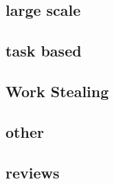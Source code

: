 \documentclass{article}
\begin{document}
\cite{Flegar:2017:OLI:3149704.3149767}
\cite{8082085}
\cite{7993387}
\cite{Cederman:2008:DLB:1413957.1413967}
\cite{10.1007/978-981-10-6442-5_56}
\cite{dlbgraphgpu}




\subsection{large scale}

\cite{PEARCE2017}
\cite{BERLINSKA201814}
\cite{8017633}
\cite{DEVINE2005133}
\cite{javataskpool}
\cite{barat:tel-01672546}



\subsection{task based}

\cite{CPE:CPE1631}
\cite{Bhatti2017}
\cite{5599103}
\cite{Posner2018}
\cite{CCGrid2018}
\cite{8025281}
\cite{7307597}
\cite{Galvez:2017:ATM:3079079.3079104} %


\subsection{Work Stealing}
\cite{Yang2017}
\cite{Chen:2015:LWS:2775085.2766450}
\cite{Blumofe:1999:SMC:324133.324234}
\cite{Cilk}
\cite{Saraswat:2011:LGL:1941553.1941582}

\subsection{other}

\cite{Gao:2017:MPL:3110224.3110240}
\cite{CAMPOS20001213}
\cite{PINAR2004974}
\cite{7551381}
\cite{Menon:2013:DDL:2503210.2503284}
\cite{Liu:2017}
\cite{SEVERIUKHINA2017139}
\cite{7965131}


\subsection{reviews}

\cite{Teresco_2partitioning}

\printbibliography
\end{document}
